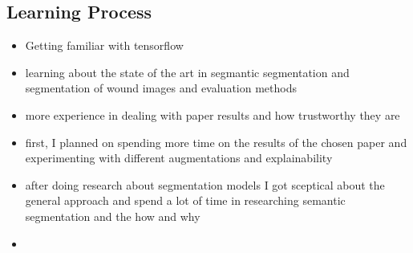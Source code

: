 \subsection{Learning Process}

\begin{itemize}
	\item Getting familiar with tensorflow
	\item learning about the state of the art in segmantic segmentation and segmentation of wound images and evaluation methods
	\item more experience in dealing with paper results and how trustworthy they are
	\item first, I planned on spending more time on the results of the chosen paper and experimenting with different augmentations and explainability
	\item after doing research about segmentation models I got sceptical about the general approach and spend a lot of time in researching semantic segmentation and the how and why
	\item 
\end{itemize}
